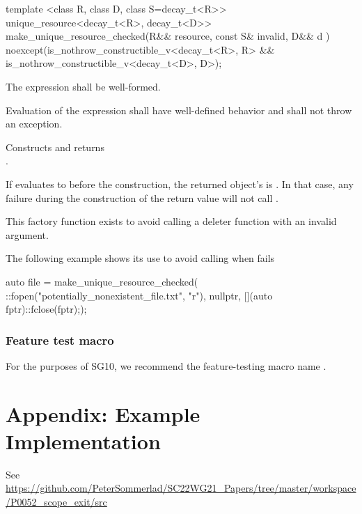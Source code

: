 \documentclass[ebook,11pt,article]{memoir}
\begin{document}
\begin{itemdecl}
template <class R, class D, class S=decay_t<R>>
unique_resource<decay_t<R>, decay_t<D>>
make_unique_resource_checked(R&& resource, const S& invalid, D&& d ) 
noexcept(is_nothrow_constructible_v<decay_t<R>, R> &&
         is_nothrow_constructible_v<decay_t<D>, D>);
\end{itemdecl}

\begin{itemdescr}
\pnum
\mandates The expression  shall be well-formed.

\pnum
\expects Evaluation of the expression  shall have well-defined behavior and shall not throw an exception.

\pnum
\effects Constructs and returns \\
. 

\pnum
If  evaluates to  before the construction, the returned  object's  is . 
In that case, any failure during the construction of the return value will not call .

\pnum
\begin{note}
This factory function exists to avoid calling a deleter function with an invalid argument. 
\end{note}

\pnum
\begin{example}
The following example shows its use to avoid calling  when  fails
\begin{codeblock}
auto file = make_unique_resource_checked(
  ::fopen("potentially_nonexistent_file.txt", "r"), 
  nullptr, [](auto fptr){::fclose(fptr);});
\end{codeblock}
\end{example}

\end{itemdescr}


\subsection {Feature test macro}
For the purposes of SG10, we recommend the feature-testing macro name .

\chapter{Appendix: Example Implementation} 
See 
\url{https://github.com/PeterSommerlad/SC22WG21_Papers/tree/master/workspace/P0052_scope_exit/src}
\end{document}
